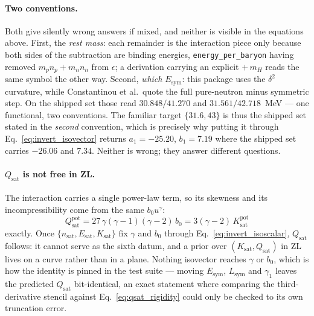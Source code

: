 \documentclass[aps,prc,onecolumn,superscriptaddress,nofootinbib,10pt]{revtex4-2}
\newcommand{\nsat}{n_{\mathrm{sat}}}
\begin{document}
\paragraph{Two conventions.} Both give silently wrong answers if mixed, and
neither is visible in the equations above. First, the \emph{rest mass}: each
remainder is the interaction piece only because both sides of the subtraction
are binding energies, \texttt{energy\_per\_baryon} having removed
$m_p n_p + m_n n_n$ from $\epsilon$; a derivation carrying an explicit
$+\,m_H$ reads the same symbol the other way. Second, \emph{which}
$E_{\mathrm{sym}}$: this package uses the $\delta^2$ curvature, while
Constantinou et al.\ quote the full pure-neutron minus symmetric step. On the
shipped set those read $30.848 / 41.270$ and $31.561 / 42.718$~MeV --- one
functional, two conventions. The familiar target $\{31.6, 43\}$ is thus the
shipped set stated in the \emph{second} convention, which is precisely why
putting it through Eq.~\eqref{eq:invert_isovector} returns $a_1 = -25.20$,
$b_1 = 7.19$ where the shipped set carries $-26.06$ and $7.34$. Neither is
wrong; they answer different questions.

\paragraph{$Q_{\mathrm{sat}}$ is not free in ZL.} The interaction carries a
single power-law term, so its skewness and its incompressibility come from the
same $b_0 u^{\gamma}$:
%
\begin{equation}
Q_{\mathrm{sat}}^{\mathrm{pot}}
  = 27\, \gamma (\gamma - 1)(\gamma - 2)\, b_0
  = 3 (\gamma - 2)\, K_{\mathrm{sat}}^{\mathrm{pot}}
\label{eq:qsat_rigidity}
\end{equation}
%
exactly. Once $\{\nsat, E_{\mathrm{sat}}, K_{\mathrm{sat}}\}$ fix $\gamma$ and
$b_0$ through Eq.~\eqref{eq:invert_isoscalar}, $Q_{\mathrm{sat}}$ follows: it
cannot serve as the sixth datum, and a prior over
$(K_{\mathrm{sat}}, Q_{\mathrm{sat}})$ in ZL lives on a curve rather than in a
plane. Nothing isovector reaches $\gamma$ or $b_0$, which is how the identity
is pinned in the test suite --- moving $E_{\mathrm{sym}}$, $L_{\mathrm{sym}}$
and $\gamma_1$ leaves the predicted $Q_{\mathrm{sat}}$ bit-identical, an exact
statement where comparing the third-derivative stencil against
Eq.~\eqref{eq:qsat_rigidity} could only be checked to its own truncation error.
\end{document}

